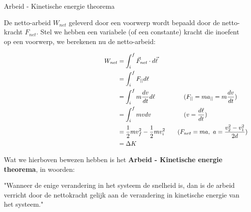 \begin{lem}{Arbeid - Kinetische energie theorema}

De netto-arbeid $ W_{net} $ geleverd door een voorwerp wordt bepaald door de netto-kracht $ F_{net} $. Stel we hebben een variabele (of een constante) kracht die inoefent op een voorwerp, we berekenen nu de netto-arbeid: 

\begin{align*}
    W_{net} &= \int_i^f \Vec{F}_{net} \cdot d\Vec{\ell} \\
            &= \int_i^f F_{||}d\ell \\
 \hspace{6.5cm} &= \int_i^f m\dfrac{dv}{dt}d\ell \qquad \qquad \ \ (F_{||} = ma_{||} = m\dfrac{dv}{dt}) \\
            &= \int_i^f mvdv \qquad \qquad \quad \  (v=\dfrac{d\ell}{dt}) \\
\hspace{6.5cm} &= \dfrac{1}{2}mv_f^2 - \dfrac{1}{2}mv_i^2 \quad \quad (F_{net} = ma, \ a = \dfrac{v_2^2 - v_1^2}{2d}) \\ 
            &= \Delta K 
\end{align*}

\noindent Wat we hierboven bewezen hebben is het \textbf{Arbeid - Kinetische energie theorema}, in woorden: 

\vspace{0.3cm} \noindent  "Wanneer de enige verandering in het systeem de snelheid is, dan is de arbeid verricht door de nettokracht gelijk aan de verandering in kinetische energie van het systeem."

\end{lem}
